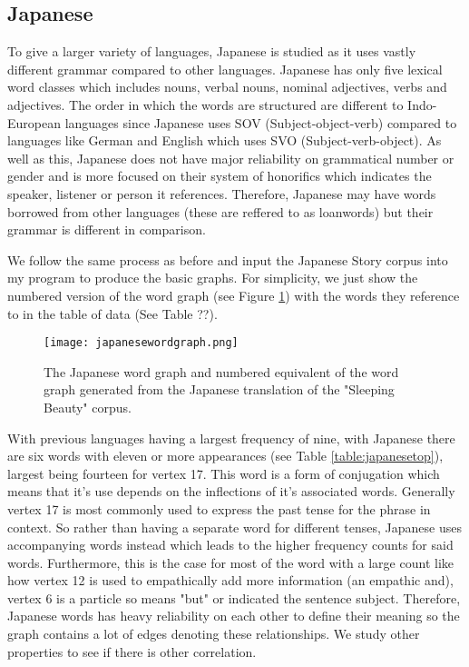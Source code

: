 \subsection{Japanese}
To give a larger variety of languages, Japanese is studied as it uses vastly different grammar compared to other languages. Japanese has only five lexical word classes which includes nouns, verbal nouns, nominal adjectives, verbs and adjectives. The order in which the words are structured are different to Indo-European languages since Japanese uses SOV (Subject-object-verb) compared to languages like German and English which uses SVO (Subject-verb-object). As well as this, Japanese does not have major reliability on grammatical number or gender and is more focused on their system of honorifics which indicates the speaker, listener or person it references. Therefore, Japanese may have words borrowed from other languages (these are reffered to as loanwords\cite{miura1979influence}) but their grammar is different in comparison. 

We follow the same process as before and input the Japanese Story corpus into my program to produce the basic graphs. For simplicity, we just show the numbered version of the word graph (see Figure \ref{fig:jpgraph}) with the words they reference to in the table of data (See Table ??).

\begin{figure}[H]
\centering
\texttt{[image: japanesewordgraph.png]}
\caption{The Japanese word graph and numbered equivalent of the word graph generated from the Japanese translation of the "Sleeping Beauty" corpus.}
\label{fig:jpgraph}
\end{figure}

With previous languages having a largest frequency of nine, with Japanese there are six words with eleven or more appearances (see Table \ref{table:japanesetop}), largest being fourteen for vertex 17. This word is a form of conjugation which means that it's use depends on the inflections of it's associated words. Generally vertex 17 is most commonly used to express the past tense for the phrase in context. So rather than having a separate word for different tenses, Japanese uses accompanying words instead which leads to the higher frequency counts for said words. Furthermore, this is the case for most of the word with a large count like how vertex 12 is used to empathically add more information (an empathic and), vertex 6 is a particle so means "but" or indicated the sentence subject. Therefore, Japanese words has heavy reliability on each other to define their meaning so the graph contains a lot of edges denoting these relationships. We study other properties to see if there is other correlation.

